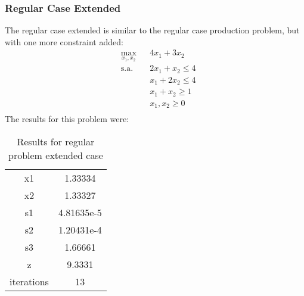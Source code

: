 \documentclass[a4paper]{IEEEtran}
\begin{document}
\subsubsection{Regular Case Extended}
 The regular case extended is similar to the regular case production problem, but with one more constraint added:
       \begin{equation}
        \begin{aligned}
            & \underset{x_1, x_2}{\text{max}}
            & & 4x_1 + 3x_2\\
            & \text{s.a.}
            & & 2x_1 + x_2 \leq 4 \\
            &&& x_1 + 2x_2 \leq 4 \\
            &&& x_1 + x_2 \geq 1 \\
            &&& x_1, x_2 \geq 0 \\
        \end{aligned}
    \end{equation}
     The results for this problem were:\\
        \begin{table}[H]
            \centering
            \begin{tabular}{c|c}
                 {x1} & 1.33334\\
                {x2} &  1.33327\\
                {s1} & 4.81635e-5\\
                {s2} & 1.20431e-4\\
                {s3} & 1.66661\\
                {z} & 9.3331\\
            iterations  & 13 \\
            \end{tabular}
            \caption{Results for regular problem extended case}
            \label{tab:2}
        \end{table}
\end{document}
